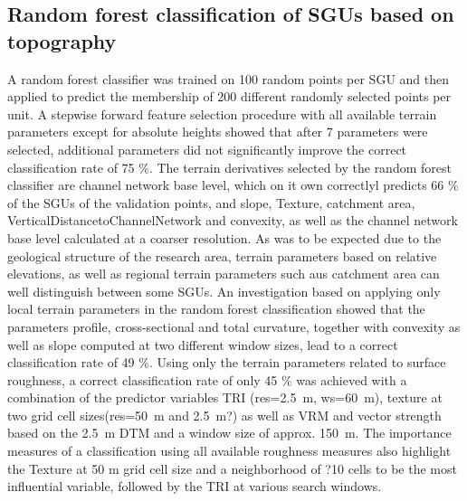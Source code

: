 \documentclass[preprint,12pt,authoryear]{elsarticle}
\begin{document}
\subsection{Random forest classification of SGUs based on topography}
A random forest classifier was trained on 100 random points per SGU and then applied to predict the membership of 200 different randomly selected points per unit. A stepwise forward feature selection procedure with all available terrain parameters except for absolute heights showed that after 7 parameters were selected, additional parameters did not significantly improve the correct classification rate of 75 \%. The terrain derivatives selected by the random forest classifier are channel network base level, which on it own correctlyl predicts 66 \% of the SGUs of the validation points, and slope, Texture, catchment area, VerticalDistancetoChannelNetwork and convexity, as well as the channel network base level calculated at a coarser resolution. As was to be expected due to the geological structure of the research area, terrain parameters based on relative elevations, as well as regional terrain parameters such aus catchment area can well distinguish between some SGUs. An investigation based on applying only local terrain parameters in the random forest classification showed that the parameters profile, cross-sectional and total curvature, together with convexity as well as slope computed at two different window sizes, lead to a correct classification rate of 49 \%. Using only the terrain parameters related to surface roughness, a correct classification rate of only 45 \% was achieved with a combination of the predictor variables TRI (res=2.5~m, ws=60~m), texture at two grid cell sizes(res=50~m and 2.5~m?) as well as VRM and vector strength based on the 2.5~m DTM and a window size of approx. 150~m. The importance measures of a classification using all available roughness measures also highlight the Texture at 50 m grid cell size and a neighborhood of ?10 cells to be the most influential variable, followed by the TRI at various search windows.
\end{document}
